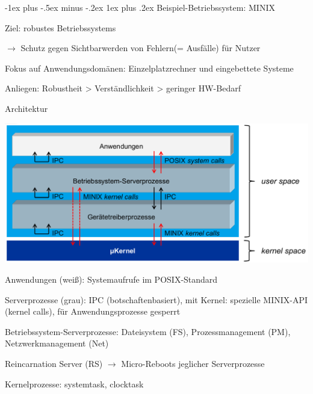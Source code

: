 \documentclass[a4paper]{article}
\makeatletter
\renewcommand{\subsubsection}{\@startsection{subsubsection}{3}{0mm}%
 {-1ex plus -.5ex minus -.2ex}%
 {1ex plus .2ex}%
 {\normalfont\small\bfseries}}
\makeatother
\begin{document}
\begin{multicols}{3}

    \subsubsection{Beispiel-Betriebssystem: MINIX}
    \begin{itemize*}
        \item Ziel: robustes Betriebssystems
        \item[$\rightarrow$] Schutz gegen Sichtbarwerden von Fehlern(= Ausfälle) für Nutzer
        \item Fokus auf Anwendungsdomänen: Einzelplatzrechner und eingebettete Systeme
        \item Anliegen: Robustheit \textgreater{} Verständlichkeit \textgreater{} geringer HW-Bedarf
    \end{itemize*}

    Architektur
    \begin{itemize*}
        \item \includegraphics[width=.8\linewidth]{Assets/AdvancedOperatingSystems-minix-architektur.png}
        \item Anwendungen (weiß): Systemaufrufe im POSIX-Standard
        \item Serverprozesse (grau): IPC (botschaftenbasiert), mit Kernel: spezielle MINIX-API (kernel calls), für Anwendungsprozesse gesperrt
        \item Betriebssystem-Serverprozesse: Dateisystem (FS), Prozessmanagement (PM), Netzwerkmanagement (Net)
        \item Reincarnation Server (RS) $\rightarrow$ Micro-Reboots jeglicher Serverprozesse
        \item Kernelprozesse: systemtask, clocktask
    \end{itemize*}


\end{multicols}
\end{document}
